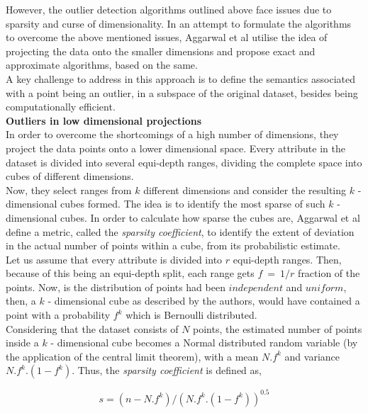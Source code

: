 However, the outlier detection algorithms outlined above face issues due to sparsity and curse of dimensionality. In an attempt to formulate the algorithms to overcome the above mentioned issues, Aggarwal et al utilise the idea of projecting the data onto the smaller dimensions\cite{aggarwal2001outlier} and propose exact and approximate algorithms, based on the same. \\

A key challenge to address in this approach is to define the semantics associated with a point being an outlier, in a subspace of the original dataset, besides being computationally efficient. \\

\noindent \textbf{Outliers in low dimensional projections} \\

In order to overcome the shortcomings of a high number of dimensions, they project the data points onto a lower dimensional space. Every attribute in the dataset is divided into several equi-depth ranges, dividing the complete space into cubes of different dimensions. \\ 

Now, they select ranges from $k$ different dimensions and consider the resulting $k$ - dimensional cubes formed. The idea is to identify the most sparse of such $k$ - dimensional cubes. In order to calculate how sparse the cubes are, Aggarwal et al define a metric, called the \textit{sparsity coefficient}, to identify the extent of deviation in the actual number of points within a cube, from its probabilistic estimate. \\

Let us assume that every attribute is divided into $r$ equi-depth ranges. Then, because of this being an equi-depth split, each range gets $f\ =\ 1/r$ fraction of the points. Now, is the distribution of points had been $independent$ and $uniform$, then, a $k$ - dimensional cube as described by the authors, would have contained a point with a probability $f^k$ which is Bernoulli distributed. \\

Considering that the dataset consists of $N$ points, the estimated number of points inside a $k$ - dimensional cube becomes a Normal distributed random variable (by the application of the central limit theorem), with a mean $N.f^k$ and variance $N.f^k.(1-f^k)$. Thus, the \textit{sparsity coefficient} is defined as,

$$s = (n - N.f^k)/(N.f^k.(1-f^k))^{0.5}$$


